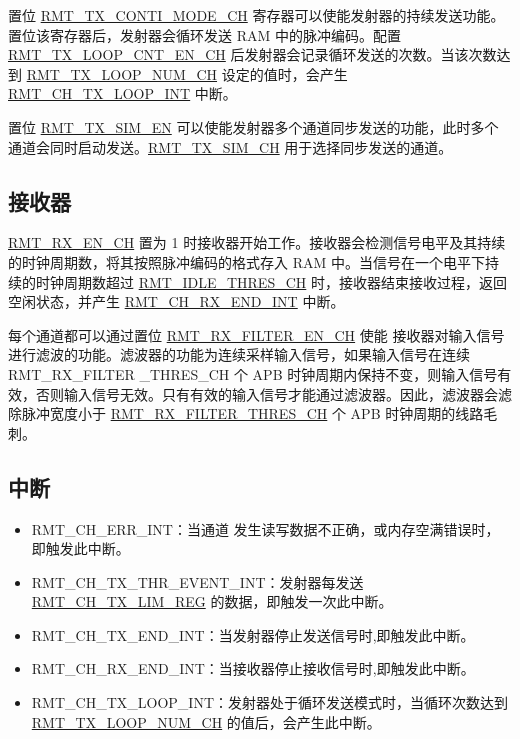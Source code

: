 \documentclass[main\_\_CN.tex]{subfiles}
\begin{document}
置位 \hyperref[fielddesc:RMTREGTXCONTIMODECHN]{RMT\_TX\_CONTI\_MODE\_CH} 寄存器可以使能发射器的持续发送功能。置位该寄存器后，发射器会循环发送 RAM 中的脉冲编码。配置 \hyperref[fielddesc:RMTREGTXLOOPCNTENCHN]{RMT\_TX\_LOOP\_CNT\_EN\_CH} 后发射器会记录循环发送的次数。当该次数达到 \hyperref[fielddesc:RMTREGTXLOOPNUMCHN]{RMT\_TX\_LOOP\_NUM\_CH} 设定的值时，会产生 \hyperref[int:RMTCHnTXLOOPINT]{RMT\_CH\_TX\_LOOP\_INT} 中断。

置位 \hyperref[fielddesc:RMTREGTXSIMEN]{RMT\_TX\_SIM\_EN} 可以使能发射器多个通道同步发送的功能，此时多个通道会同时启动发送。\hyperref[fielddesc:RMTREGTXSIMCHN]{RMT\_TX\_SIM\_CH} 用于选择同步发送的通道。

\subsection{接收器}
\hyperref[fielddesc:RMTREGRXENCHN]{RMT\_RX\_EN\_CH} 置为 1 时接收器开始工作。接收器会检测信号电平及其持续的时钟周期数，将其按照脉冲编码的格式存入 RAM 中。当信号在一个电平下持续的时钟周期数超过 \hyperref[fielddesc:RMTREGIDLETHRESCHN]{RMT\_IDLE\_THRES\_CH} 时，接收器结束接收过程，返回空闲状态，并产生 \hyperref[int:RMTCHnRXENDINT]{RMT\_CH\_RX\_END\_INT} 中断。

每个通道都可以通过置位 \hyperref[fielddesc:RMTREGRXFILTERENCHN]{RMT\_RX\_FILTER\_EN\_CH} 使能 接收器对输入信号进行滤波的功能。滤波器的功能为连续采样输入信号，如果输入信号在连续 RMT\_RX\_FILTER \_THRES\_CH 个 APB  时钟周期内保持不变，则输入信号有效，否则输入信号无效。只有有效的输入信号才能通过滤波器。因此，滤波器会滤除脉冲宽度小于 \hyperref[fielddesc:RMTREGRXFILTERTHRESCHN]{RMT\_RX\_FILTER\_THRES\_CH} 个 APB 时钟周期的线路毛刺。

\subsection{中断}
\begin{itemize}
\item \label{int:RMTCHnERRINT}RMT\_CH\_ERR\_INT：当通道   发生读写数据不正确，或内存空满错误时，即触发此中断。
\item \label{int:RMTCHnTXTHREVENTINT}RMT\_CH\_TX\_THR\_EVENT\_INT：发射器每发送 \hyperref[regdesc:RMTCHNTXLIMREG]{RMT\_CH\_TX\_LIM\_REG} 的数据，即触发一次此中断。
\item \label{int:RMTCHnTXENDINT}RMT\_CH\_TX\_END\_INT：当发射器停止发送信号时,即触发此中断。
\item \label{int:RMTCHnRXENDINT}RMT\_CH\_RX\_END\_INT：当接收器停止接收信号时,即触发此中断。
\item \label{int:RMTCHnTXLOOPINT}RMT\_CH\_TX\_LOOP\_INT：发射器处于循环发送模式时，当循环次数达到 \hyperref[fielddesc:RMTREGTXLOOPNUMCHN]{RMT\_TX\_LOOP\_NUM\_CH} 的值后，会产生此中断。
\end{itemize}
\end{document}
